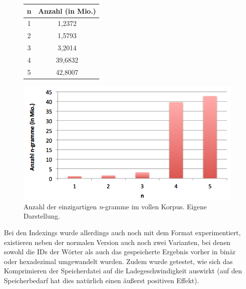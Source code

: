 \documentclass[a4paper,12pt]{scrartcl}
\begin{document}
    \begin{figure}[h]
        \begin{minipage}[t]{0.35\textwidth}
            \centering
            \begin{tabular}{c|c}
                n & Anzahl (in Mio.) \\
                \hline \hline
                1 & 1,2372 \\
                \hline
                2 & 1,5793 \\
                \hline
                3 & 3,2014 \\
                \hline
                4 & 39,6832 \\
                \hline
                5 & 42,8007 \\
            \end{tabular}
        \end{minipage}
        \begin{minipage}{0.65\textwidth}
            \centering
            \includegraphics[width=\textwidth]{./img/ngrams.png}
        \end{minipage}
        \caption{Anzahl der einzigartigen \emph{n}-gramme im vollen Korpus. Eigene Darstellung.}
    \end{figure}

    Bei den Indexings wurde allerdings auch noch mit dem Format experimentiert, existieren neben der normalen Version auch noch zwei Varianten, bei denen sowohl die IDs der Wörter als auch das gespeicherte Ergebnis vorher in binär oder hexadezimal umgewandelt wurden. Zudem wurde getestet, wie sich das Komprimieren der Speicherdatei auf die Ladegeschwindigkeit auswirkt (auf den Speicherbedarf hat dies natürlich einen äußerst positiven Effekt). \\
\end{document}
